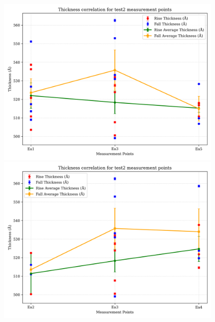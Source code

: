 \documentclass[platex,dvipdfmx,10pt,twoside,a4paper,jis2004]{jsarticle}
\begin{document}
\begin{figure}[H]
    \centering
    \begin{minipage}[t]{0.48\textwidth}
        \centering
        \includegraphics[width=\linewidth]{thickness_correlation_test2_Ea1-3-5.png}
    \end{minipage}
    \hfill
    \begin{minipage}[t]{0.48\textwidth}
        \centering
        \includegraphics[width=\linewidth]{thickness_correlation_test2_Ea2-3-4.png}
    \end{minipage}
    \label{fig:test2_ea_correlations}
\end{figure}
\end{document}
